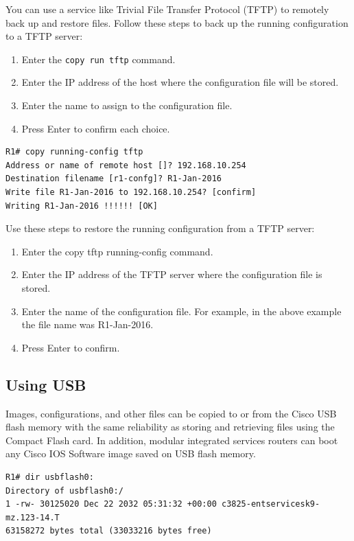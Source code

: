 You can use a service like Trivial File Transfer Protocol (TFTP) to remotely back up and restore files. Follow these steps to back up the running configuration to a TFTP server:

\begin{enumerate}
\item Enter the \verb|copy run tftp| command.
\item Enter the IP address of the host where the configuration file will be stored.
\item Enter the name to assign to the configuration file.
\item Press Enter to confirm each choice.
\end{enumerate}

\begin{verbatim}
R1# copy running-config tftp
Address or name of remote host []? 192.168.10.254
Destination filename [r1-confg]? R1-Jan-2016
Write file R1-Jan-2016 to 192.168.10.254? [confirm]
Writing R1-Jan-2016 !!!!!! [OK]
\end{verbatim}

Use these steps to restore the running configuration from a TFTP server:

\begin{enumerate}
\item Enter the copy tftp running-config command.
\item Enter the IP address of the TFTP server where the configuration file is stored.
\item Enter the name of the configuration file. For example, in the above example the file name was R1-Jan-2016.
\item Press Enter to confirm.
\end{enumerate}

\subsection{Using USB}

Images, configurations, and other files can be copied to or from the Cisco USB flash memory with the same reliability as storing and retrieving files using the Compact Flash card. In addition, modular integrated services routers can boot any Cisco IOS Software image saved on USB flash memory. 

\begin{verbatim}
R1# dir usbflash0:
Directory of usbflash0:/
1 -rw- 30125020 Dec 22 2032 05:31:32 +00:00 c3825-entservicesk9-mz.123-14.T
63158272 bytes total (33033216 bytes free)
\end{verbatim}

